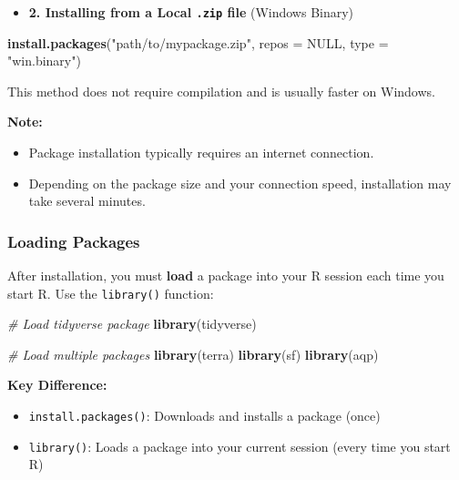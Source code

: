 \documentclass[
  10pt,
  b5paper,
  oneside]{book}
\newenvironment{Shaded}{\begin{snugshade}}{\end{snugshade}}
\newcommand{\AttributeTok}[1]{\textcolor[rgb]{0.13,0.29,0.53}{#1}}
\newcommand{\CommentTok}[1]{\textcolor[rgb]{0.56,0.35,0.01}{\textit{#1}}}
\newcommand{\ConstantTok}[1]{\textcolor[rgb]{0.56,0.35,0.01}{#1}}
\newcommand{\FunctionTok}[1]{\textcolor[rgb]{0.13,0.29,0.53}{\textbf{#1}}}
\newcommand{\NormalTok}[1]{#1}
\newcommand{\StringTok}[1]{\textcolor[rgb]{0.31,0.60,0.02}{#1}}
\providecommand{\tightlist}{%
  \setlength{\itemsep}{0pt}\setlength{\parskip}{0pt}}
\begin{document}
\begin{itemize}
\tightlist
\item
  \textbf{2. Installing from a Local \texttt{.zip} file} (Windows Binary)
\end{itemize}

\begin{Shaded}
\begin{Highlighting}[]
\FunctionTok{install.packages}\NormalTok{(}\StringTok{"path/to/mypackage.zip"}\NormalTok{, }\AttributeTok{repos =} \ConstantTok{NULL}\NormalTok{, }\AttributeTok{type =} \StringTok{"win.binary"}\NormalTok{)}
\end{Highlighting}
\end{Shaded}

This method does not require compilation and is usually faster on Windows.

\textbf{Note:}

\begin{itemize}
\item
  Package installation typically requires an internet connection.
\item
  Depending on the package size and your connection speed, installation may take several minutes.
\end{itemize}

\subsubsection{Loading Packages}\label{loading-packages}

After installation, you must \textbf{load} a package into your R session each time you start R.
Use the \texttt{library()} function:

\begin{Shaded}
\begin{Highlighting}[]
\CommentTok{\# Load tidyverse package}
\FunctionTok{library}\NormalTok{(tidyverse)}

\CommentTok{\# Load multiple packages}
\FunctionTok{library}\NormalTok{(terra)}
\FunctionTok{library}\NormalTok{(sf)}
\FunctionTok{library}\NormalTok{(aqp)}
\end{Highlighting}
\end{Shaded}

\textbf{Key Difference:}

\begin{itemize}
\tightlist
\item
  \texttt{install.packages()}: Downloads and installs a package (once)
\item
  \texttt{library()}: Loads a package into your current session (every time you start R)
\end{itemize}
\end{document}
